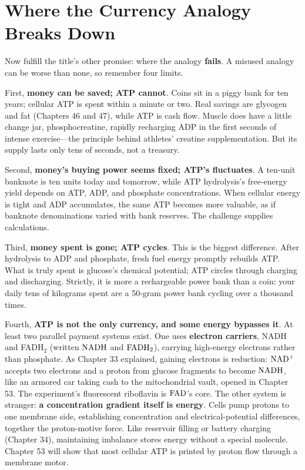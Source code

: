 \section{Where the Currency Analogy Breaks Down}

Now fulfill the title's other promise: where the analogy \textbf{fails}. A misused analogy can be worse than none, so remember four limits.

First, \textbf{money can be saved; ATP cannot}. Coins sit in a piggy bank for ten years; cellular ATP is spent within a minute or two. Real savings are glycogen and fat (Chapters 46 and 47), while ATP is cash flow. Muscle does have a little change jar, phosphocreatine, rapidly recharging ADP in the first seconds of intense exercise---the principle behind athletes' creatine supplementation. But its supply lasts only tens of seconds, not a treasury.

Second, \textbf{money's buying power seems fixed; ATP's fluctuates}. A ten-unit banknote is ten units today and tomorrow, while ATP hydrolysis's free-energy yield depends on ATP, ADP, and phosphate concentrations. When cellular energy is tight and ADP accumulates, the same ATP becomes more valuable, as if banknote denominations varied with bank reserves. The challenge supplies calculations.

Third, \textbf{money spent is gone; ATP cycles}. This is the biggest difference. After hydrolysis to ADP and phosphate, fresh fuel energy promptly rebuilds ATP. What is truly spent is glucose's chemical potential; ATP circles through charging and discharging. Strictly, it is more a rechargeable power bank than a coin: your daily tens of kilograms spent are a 50-gram power bank cycling over a thousand times.

Fourth, \textbf{ATP is not the only currency, and some energy bypasses it}. At least two parallel payment systems exist. One uses \textbf{electron carriers}, NADH and FADH$_2$ (written $\mathrm{NADH}$ and $\mathrm{FADH_2}$), carrying high-energy electrons rather than phosphate. As Chapter 33 explained, gaining electrons is reduction: $\mathrm{NAD^+}$ accepts two electrons and a proton from glucose fragments to become $\mathrm{NADH}$, like an armored car taking cash to the mitochondrial vault, opened in Chapter 53. The experiment's fluorescent riboflavin is $\mathrm{FAD}$'s core. The other system is stranger: \textbf{a concentration gradient itself is energy}. Cells pump protons to one membrane side, establishing concentration and electrical-potential differences, together the proton-motive force. Like reservoir filling or battery charging (Chapter 34), maintaining imbalance stores energy without a special molecule. Chapter 53 will show that most cellular ATP is printed by proton flow through a membrane motor.

